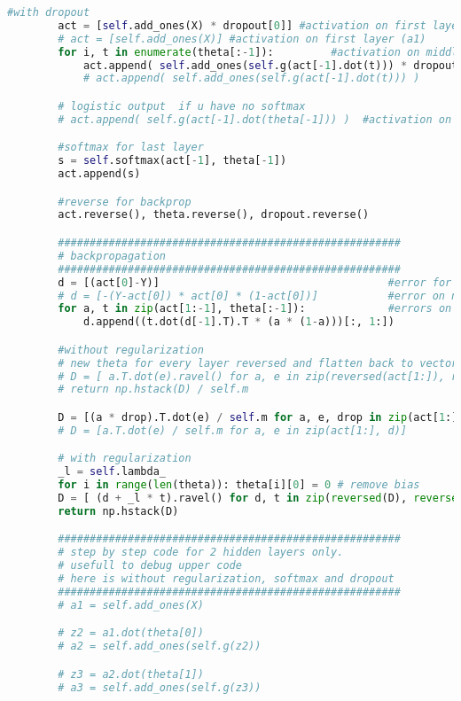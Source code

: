 \documentclass[a4paper,11pt]{article}
\begin{document}
\begin{lstlisting}[language=Python]
        #with dropout
        act = [self.add_ones(X) * dropout[0]] #activation on first layer (a1)
        # act = [self.add_ones(X)] #activation on first layer (a1)
        for i, t in enumerate(theta[:-1]):         #activation on middle layers
            act.append( self.add_ones(self.g(act[-1].dot(t))) * dropout[i+1] )
            # act.append( self.add_ones(self.g(act[-1].dot(t))) )

        # logistic output  if u have no softmax
        # act.append( self.g(act[-1].dot(theta[-1])) )  #activation on last layer

        #softmax for last layer
        s = self.softmax(act[-1], theta[-1])
        act.append(s)

        #reverse for backprop
        act.reverse(), theta.reverse(), dropout.reverse()

        ######################################################
        # backpropagation
        ######################################################
        d = [(act[0]-Y)]                                    #error for softmax
        # d = [-(Y-act[0]) * act[0] * (1-act[0])]           #error on normal last layer
        for a, t in zip(act[1:-1], theta[:-1]):             #errors on middle layers
            d.append((t.dot(d[-1].T).T * (a * (1-a)))[:, 1:])

        #without regularization
        # new theta for every layer reversed and flatten back to vector
        # D = [ a.T.dot(e).ravel() for a, e in zip(reversed(act[1:]), reversed(d))]
        # return np.hstack(D) / self.m

        D = [(a * drop).T.dot(e) / self.m for a, e, drop in zip(act[1:], d, dropout)]
        # D = [a.T.dot(e) / self.m for a, e in zip(act[1:], d)]

        # with regularization
        _l = self.lambda_
        for i in range(len(theta)): theta[i][0] = 0 # remove bias
        D = [ (d + _l * t).ravel() for d, t in zip(reversed(D), reversed(theta))]
        return np.hstack(D)

        ######################################################
        # step by step code for 2 hidden layers only.
        # usefull to debug upper code
        # here is without regularization, softmax and dropout
        ######################################################
        # a1 = self.add_ones(X)

        # z2 = a1.dot(theta[0])
        # a2 = self.add_ones(self.g(z2))

        # z3 = a2.dot(theta[1])
        # a3 = self.add_ones(self.g(z3))


\end{lstlisting}
\end{document}
